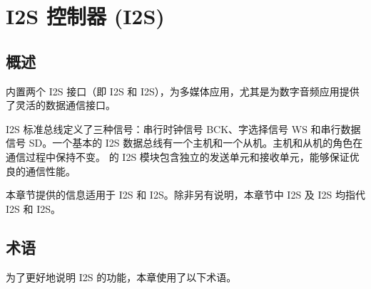 \documentclass[main\_\_CN.tex]{subfiles}
\begin{document}

\ifglobal
\else
    {\let\clearpage\relax \listoftodos}
    \tableofcontents
\fi



\hypertarget{i2s}{}
\chapter{I2S 控制器 (I2S)}
\label{mod:i2s}

\section{概述}
\chipname{} 内置两个 I2S 接口（即 I2S 和 I2S），为多媒体应用，尤其是为数字音频应用提供了灵活的数据通信接口。

I2S 标准总线定义了三种信号：串行时钟信号 BCK、字选择信号 WS 和串行数据信号 SD。一个基本的 I2S 数据总线有一个主机和一个从机。主机和从机的角色在通信过程中保持不变。\chipname{} 的 I2S 模块包含独立的发送单元和接收单元，能够保证优良的通信性能。

\begin{tiplisting}
本章节提供的信息适用于 I2S 和 I2S。除非另有说明，本章节中 I2S 及 I2S 均指代 I2S 和 I2S。
\end{tiplisting}

\section{术语}

为了更好地说明 I2S 的功能，本章使用了以下术语。
\end{document}
